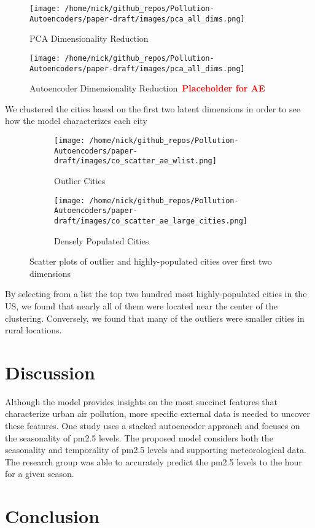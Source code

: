 \documentclass{article}
\newcommand\note[1]{\textbf{\textcolor{red}{#1}}}
\begin{document}
\begin{figure}[h!]
    \texttt{[image: /home/nick/github\_repos/Pollution-Autoencoders/paper-draft/images/pca\_all\_dims.png]} 
    \caption{PCA Dimensionality Reduction}
    \label{fig:ae_dim_reduction}
\end{figure}

\begin{figure}[h!]
    \texttt{[image: /home/nick/github\_repos/Pollution-Autoencoders/paper-draft/images/pca\_all\_dims.png]} 
    \caption{Autoencoder Dimensionality Reduction\ \note{Placeholder for AE}}

    \label{fig:ae_dim_reduction}
\end{figure}

\par We clustered the cities based on the first two latent dimensions in order to see how
the model characterizes each city

\begin{figure}[h!]
\begin{subfigure}{0.5\textwidth}
    \texttt{[image: /home/nick/github\_repos/Pollution-Autoencoders/paper-draft/images/co\_scatter\_ae\_wlist.png]} 
    \caption{Outlier Cities}
    \label{fig:outliers}
\end{subfigure}%
\begin{subfigure}{0.5\textwidth}
    \texttt{[image: /home/nick/github\_repos/Pollution-Autoencoders/paper-draft/images/co\_scatter\_ae\_large\_cities.png]}
    \caption{Densely Populated Cities}
    \label{fig:dense_cities}
\end{subfigure}

\caption{Scatter plots of outlier and highly-populated cities over first two dimensions}
\label{fig:outliers_vs_dense_cities}
\end{figure}

\par By selecting from a list the top two hundred most highly-populated cities in the US, we found that nearly all of them were located near the center of the clustering. Conversely, we found that many of the outliers were smaller cities in rural locations. 

\section{Discussion}

Although the model provides insights on the most succinct features that characterize urban air pollution, more specific external data is needed to uncover these features. One study \parencite{Bai2019} uses a stacked autoencoder approach and focuses on the seasonality of pm2.5 levels. The proposed model considers both the seasonality and temporality of pm2.5 levels and supporting meteorological data. The research group was able to accurately predict the pm2.5 levels to the hour for a given season.

\section{Conclusion}

\printbibliography
\end{document}
